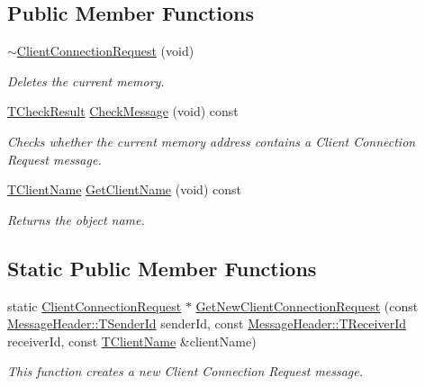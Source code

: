 \subsection*{Public Member Functions}
\begin{DoxyCompactItemize}
\item 
\hyperlink{class_terra_swarm_1_1_synchronous_1_1_client_connection_request_a810bd205bf787cbdbf931501666d2445}{$\sim$\-Client\-Connection\-Request} (void)
\begin{DoxyCompactList}\small\item\em Deletes the current memory. \end{DoxyCompactList}\item 
\hyperlink{class_terra_swarm_1_1_synchronous_1_1_client_connection_request_af97d7c46396bc29dd8a2628f32a434f2}{T\-Check\-Result} \hyperlink{class_terra_swarm_1_1_synchronous_1_1_client_connection_request_ac50add84d52e10fcaf148444c09e7145}{Check\-Message} (void) const 
\begin{DoxyCompactList}\small\item\em Checks whether the current memory address contains a Client Connection Request message. \end{DoxyCompactList}\item 
\hyperlink{class_terra_swarm_1_1_synchronous_1_1_client_connection_request_a7d85ca6773adf2b3b32cfbff9706f882}{T\-Client\-Name} \hyperlink{class_terra_swarm_1_1_synchronous_1_1_client_connection_request_a94838790aca6aa864fd95b85bddfeaeb}{Get\-Client\-Name} (void) const 
\begin{DoxyCompactList}\small\item\em Returns the object name. \end{DoxyCompactList}\end{DoxyCompactItemize}
\subsection*{Static Public Member Functions}
\begin{DoxyCompactItemize}
\item 
static \hyperlink{class_terra_swarm_1_1_synchronous_1_1_client_connection_request}{Client\-Connection\-Request} $\ast$ \hyperlink{class_terra_swarm_1_1_synchronous_1_1_client_connection_request_a73614eb55926c474741df4d752a34331}{Get\-New\-Client\-Connection\-Request} (const \hyperlink{class_terra_swarm_1_1_message_header_a516b36855e2aad7cfbf8770f1b42784f}{Message\-Header\-::\-T\-Sender\-Id} sender\-Id, const \hyperlink{class_terra_swarm_1_1_message_header_aa3260702b182b6f88ddbdd3416e98df0}{Message\-Header\-::\-T\-Receiver\-Id} receiver\-Id, const \hyperlink{class_terra_swarm_1_1_synchronous_1_1_client_connection_request_a7d85ca6773adf2b3b32cfbff9706f882}{T\-Client\-Name} \&client\-Name)
\begin{DoxyCompactList}\small\item\em This function creates a new Client Connection Request message. \end{DoxyCompactList}\end{DoxyCompactItemize}

